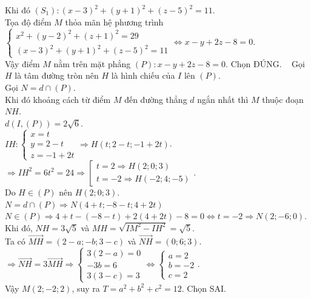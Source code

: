 \begin{ex}
{\begin{itemchoice}
			Khi đó $(S_1) \colon (x - 3)^2 + (y + 1)^2 + (z - 5)^2 = 11$.\\
			Tọa độ điểm $M$ thỏa mãn hệ phương trình\\
			$\begin{cases} x^2 + (y - 2)^2 + (z + 1)^2 = 29 \\ (x - 3)^2 + (y + 1)^2 + (z - 5)^2 = 11 \end{cases} \Leftrightarrow x - y + 2z - 8 = 0$.\\
			Vậy điểm $M$ nằm trên mặt phẳng $(P) \colon x - y + 2z - 8 = 0$. Chọn ĐÚNG.
			\itemch 
			Gọi $H$ là tâm đường tròn nên $H$ là hình chiếu của $I$ lên $(P)$.\\
			Gọi $N = d \cap (P)$.\\
			Khi đó khoảng cách từ điểm $M$ đến đường thẳng $d$ ngắn nhất thì $M$ thuộc đoạn $NH$.\\
			$d(I, (P)) = 2\sqrt{6}$.\\
			$IH \colon \begin{cases} x = t \\ y = 2 - t \\ z = -1 + 2t \end{cases} \Rightarrow H(t; 2 - t; -1 + 2t)$.\\
			$\Rightarrow IH^2 = 6t^2 = 24 \Rightarrow \left[\begin{array}{l} t = 2 \Rightarrow H(2; 0; 3) \\ t = -2 \Rightarrow H(-2; 4; -5) \end{array}\right.$.\\
			Do $H \in (P)$ nên $H(2; 0; 3)$.\\
			$N = d \cap (P) \Rightarrow N(4 + t; -8 - t; 4 + 2t)$\\
			$N \in (P) \Rightarrow 4 + t - (-8 - t) + 2(4 + 2t) - 8 = 0 \Leftrightarrow t = -2 \Rightarrow N(2; -6; 0)$.\\
			Khi đó, $NH = 3\sqrt{5}$ và $MH = \sqrt{IM^2 - IH^2} = \sqrt{5}$.\\
			Ta có $\overrightarrow{MH} = (2 - a; -b; 3 - c)$ và $\overrightarrow{NH} = (0; 6; 3)$.\\
			$\Rightarrow \overrightarrow{NH} = 3\overrightarrow{MH} \Rightarrow \begin{cases} 3(2 - a) = 0 \\ -3b = 6 \\ 3(3 - c) = 3 \end{cases} \Leftrightarrow \begin{cases} a = 2 \\ b = -2 \\ c = 2 \end{cases}$.\\
			Vậy $M(2; -2; 2)$, suy ra $T = a^2 + b^2 + c^2 = 12$. Chọn SAI.
		\end{itemchoice}
	}
\end{ex}

